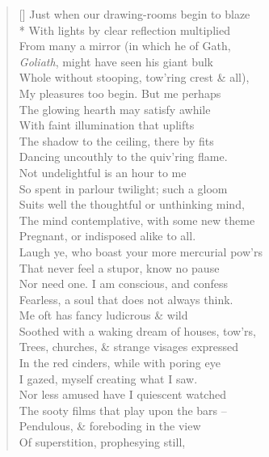 \documentclass[MAIN]{subfiles}
\begin{document}
\settowidth{\versewidth}{Just when our drawing-rooms begin to blaze}
\begin{verse}[\versewidth]
Just when our drawing-rooms begin to blaze\\*
With lights by clear reflection multiplied\\
From many a mirror (in which he of {\sc Gath},\\
\emph{Goliath}, might have seen his giant bulk\\
Whole without stooping, tow'ring crest \& all),\\
My pleasures too begin. But me perhaps\\
The glowing hearth may satisfy awhile\\
With faint illumination that uplifts\\
The shadow to the ceiling, there by fits\\
Dancing uncouthly to the quiv'ring flame.\\
Not undelightful is an hour to me\\
So spent in parlour twilight; such a gloom\\
Suits well the thoughtful or unthinking mind,\\
The mind contemplative, with some new theme\\
Pregnant, or indisposed alike to all.\\
Laugh ye, who boast your more mercurial pow'rs\\
That never feel a stupor, know no pause\\
Nor need one. I am conscious, and confess\\
Fearless, a soul that does not always think.\\
Me oft has fancy ludicrous \& wild\\
Soothed with a waking dream of houses, tow'rs,\\
Trees, churches, \& strange visages expressed\\
In the red cinders, while with poring eye\\
I gazed, myself creating what I saw.\\
Nor less amused have I quiescent watched\\
The sooty films that play upon the bars --\\
Pendulous, \& foreboding in the view\\
Of superstition, prophesying still,\\

\end{verse}
\end{document}
